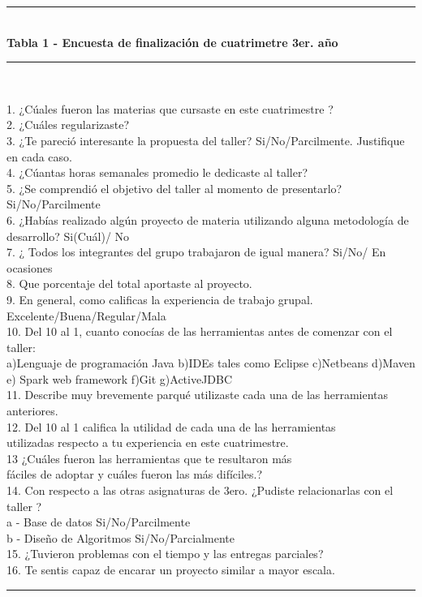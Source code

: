 
\begin{center}
 \rule{60mm}{0.1mm}\\
\textbf{Tabla 1 - Encuesta de finalización de cuatrimetre 3er. año} \\
\rule{60mm}{0.1mm}\\
\end{center}




1. ¿Cúales fueron las materias que cursaste en este cuatrimestre ?\\
2. ¿Cuáles regularizaste?\\
3. ¿Te pareció interesante la propuesta del taller?  Si/No/Parcilmente. Justifique en cada caso.\\
4. ¿Cúantas horas semanales promedio le dedicaste al taller?\\
5. ¿Se comprendió  el objetivo del taller al momento de presentarlo?  Si/No/Parcilmente \\
6. ¿Habías realizado algún proyecto de materia utilizando alguna metodología de desarrollo? Si(Cuál)/ No\\
7. ¿ Todos los integrantes del grupo trabajaron de igual manera? Si/No/ En ocasiones\\
8. Que porcentaje del total aportaste al proyecto.\\
9. En general, como calificas la experiencia de trabajo grupal. Excelente/Buena/Regular/Mala\\
10. Del 10 al 1, cuanto conocías de las herramientas antes de comenzar con el taller:\\
a)Lenguaje de programación Java b)IDEs tales como Eclipse c)Netbeans d)Maven e) Spark web framework f)Git g)ActiveJDBC\\
11. Describe muy brevemente parqué utilizaste cada una de las herramientas anteriores.\\
12. Del 10 al 1 califica la utilidad de cada una de las herramientas\\ utilizadas respecto a tu experiencia en este cuatrimestre.\\
13 ¿Cuáles fueron las herramientas que te resultaron más\\ fáciles de adoptar y cuáles fueron las más difíciles.?\\
14. Con respecto a las otras asignaturas de 3ero. ¿Pudiste relacionarlas con el taller ?\\
    a - Base de datos  Si/No/Parcilmente\\
    b - Diseño de Algoritmos Si/No/Parcialmente\\
15. ¿Tuvieron problemas con el tiempo y las entregas parciales?\\
16. Te sentis capaz de encarar un proyecto similar a mayor escala.\\
\rule{60mm}{0.1mm}\\



 

   
